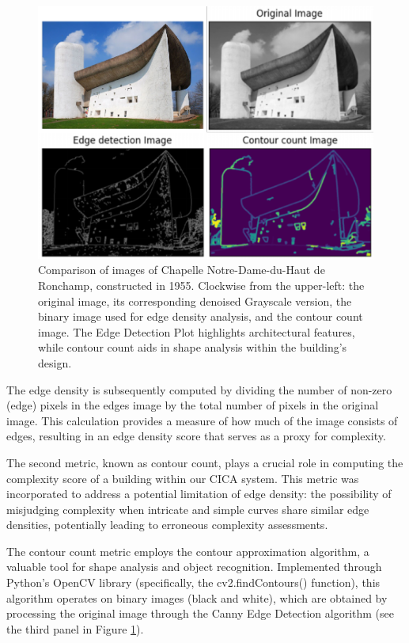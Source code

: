      \begin{figure}[htb]
          \centering
          \includegraphics[width= \linewidth]{Images/ComplexityPlotHistoryCICA}
          \caption{Comparison of images of Chapelle Notre-Dame-du-Haut de Ronchamp, constructed in 1955. Clockwise from the upper-left: the original image, its corresponding denoised Grayscale version, the binary image used for edge density analysis, and the contour count image. The Edge Detection Plot highlights architectural features, while contour count aids in shape analysis within the building's design.}
          \label{fig:ComplexityPlotHistory}
        \end{figure}

The edge density is subsequently computed by dividing the number of non-zero (edge) pixels in the edges image by the total number of pixels in the original image.
This calculation provides a measure of how much of the image consists of edges, resulting in an edge density score that serves as a proxy for complexity.

The second metric, known as contour count, plays a crucial role in computing the complexity score of a building within our CICA system.
This metric was incorporated to address a potential limitation of edge density: the possibility of misjudging complexity when intricate and simple curves share similar edge densities, potentially leading to erroneous complexity assessments.

The contour count metric employs the contour approximation algorithm, a valuable tool for shape analysis and object recognition\cite{ContourOpenCV2023}.
Implemented through Python's OpenCV library (specifically, the cv2.findContours() function), this algorithm operates on binary images (black and white), which are obtained by processing the original image through the Canny Edge Detection algorithm (see the third panel in Figure \ref{fig:ComplexityPlotHistory}).

